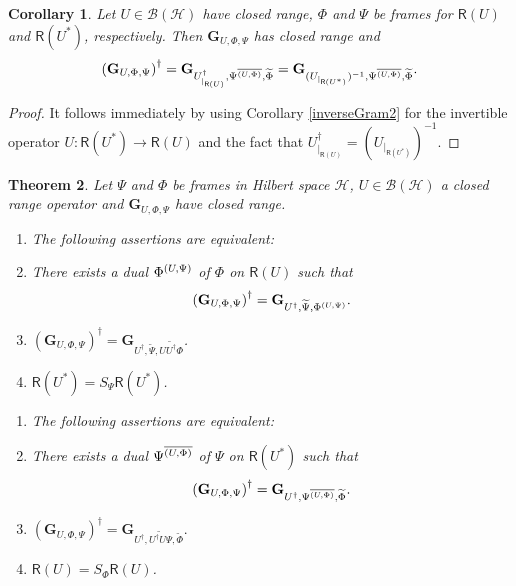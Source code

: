 \documentclass{birkjour}
\newtheorem{thm}{Theorem}[section]
\newtheorem{cor}[thm]{Corollary}
\theoremstyle{definition}
\theoremstyle{remark}
\numberwithin{equation}{section}
\newcommand{\range}[1]{\mathsf{R}\left( #1 \right)}
\def\Hil{\mathcal{H}}
\newcommand{\BL}[1]{
{\mathcal B} \left( #1 \right)
}
\begin{document}
\begin{cor}
Let $U\in \BL{\Hil}$ have closed range, $\Phi$ and $\Psi$ be
frames for $\range U$ and $\range {U^*}$, respectively. Then
$\mathbf{G}_{U,\Phi,\Psi}$ has closed range and
$$\left(\mathbf{G}_{U,\Phi,\Psi}\right)^{\dagger}=\mathbf{G}_{U^{\dagger}_{|_{\range {U}}},\Psipd,\widetilde{\Phi}}=\mathbf{G}_{(U_{|_{\range{U^*}}})^{-1},\Psipd,\widetilde{\Phi}}.$$
\end{cor}
\begin{proof}
It follows immediately by using Corollary \ref{inverseGram2} for
the invertible operator  $U:\range {U^*}\rightarrow \range U$
and the fact that  $U^{\dagger}_{|_{\range
{U}}}=(U_{|_{\range{U^*}}})^{-1}$.
\end{proof}


\begin{thm}\label{pseudo Gram}
Let $\Psi$ and $\Phi$ be frames in Hilbert space $\mathcal{H}$,
$U\in \BL{\mathcal{H}}$ a closed range operator and
$\mathbf{G}_{U,\Phi,\Psi}$ have
 closed range. 
\begin{enumerate}
\item[(1)] The following assertions are equivalent:
\item There exists a  dual $\Phi^{\left(U,\Psi\right)}$ of $\Phi$  on $\range{U}$ such that
\begin{eqnarray*}
\left(\mathbf{G}_{U,\Phi,\Psi}\right)^{\dagger}=\mathbf{G}_{U^{\dag},\widetilde{\Psi},\Phi^{\left(U,\Psi\right)}}.
\end{eqnarray*}
\item\label{iii}$
 \left(\mathbf{G}_{U,\Phi,\Psi}\right)^{\dagger}=
 \mathbf{G}_{U^{\dagger},\widetilde{\Psi},\widetilde{UU^{\dagger}\Phi}}
$.  \item$\range{U^*}=S_{\Psi}\range{U^*}$.
\end{enumerate}
\begin{enumerate}
\item[(2)] The following assertions are equivalent:
 \item\label{ii} There exists a  dual $\Psi^{\overline{\left( U,\Phi\right)}}$ of $\Psi$ on $\range{U^*}$  such that
\begin{eqnarray*}
\left(\mathbf{G}_{U,\Phi,\Psi}\right)^{\dagger}=\mathbf{G}_{U^{\dagger},{\Psi^{\overline{\left( U,\Phi\right)}}},\widetilde{\Phi}}.
\end{eqnarray*}
\item $ \left(\mathbf{G}_{U,\Phi,\Psi}\right)^{\dagger}=
\mathbf{G}_{U^{\dagger},\widetilde{U^{\dagger}U\Psi},\widetilde{\Phi}}.$
 \item \label{i}  $\range{U}=S_{\Phi}\range{U}$.
\end{enumerate}
\end{thm}
\end{document}
